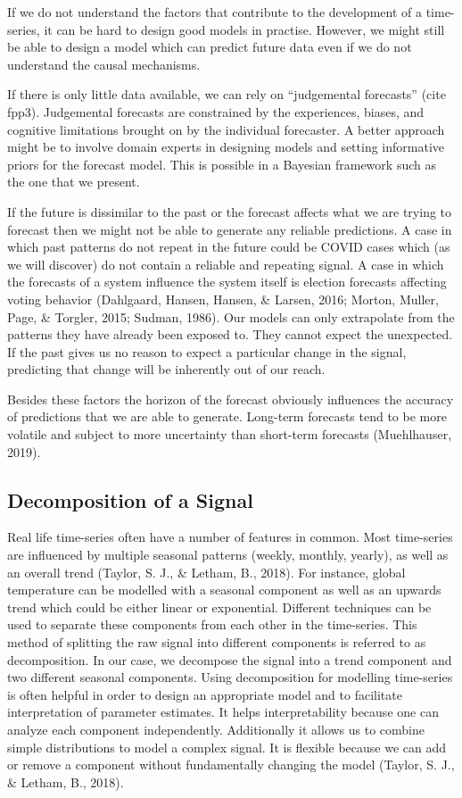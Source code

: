 \documentclass{article}
\begin{document}
If we do not understand the factors that contribute to the development of a time-series, it can be hard to design good models in practise. However, we might still be able to design a model which can predict future data even if we do not understand the causal mechanisms. 

If there is only little data available, we can rely on “judgemental forecasts” (cite fpp3). Judgemental forecasts are constrained by the experiences, biases, and cognitive limitations brought on by the individual forecaster. A better approach might be to involve domain experts in designing models and setting informative priors for the forecast model.  This is possible in a Bayesian framework such as the one that we present.

If the future is dissimilar to the past or the forecast affects what we are trying to forecast then we might not be able to generate any reliable predictions. A case in which past patterns do not repeat in the future could be COVID cases which (as we will discover) do not contain a reliable and repeating signal. A case in which the forecasts of a system influence the system itself is election forecasts affecting voting behavior (Dahlgaard, Hansen, Hansen, \& Larsen, 2016; Morton, Muller, Page, \& Torgler, 2015; Sudman, 1986). Our models can only extrapolate from the patterns they have already been exposed to. They cannot expect the unexpected. If the past gives us no reason to expect a particular change in the signal, predicting that change will be inherently out of our reach. 

Besides these factors the horizon of the forecast obviously influences the accuracy of predictions that we are able to generate. Long-term forecasts tend to be more volatile and subject to more uncertainty than short-term forecasts (Muehlhauser, 2019).  


\subsection{Decomposition of a Signal}

Real life time-series often have a number of features in common. Most time-series are influenced by multiple seasonal patterns (weekly, monthly, yearly), as well as an overall trend (Taylor, S. J., \& Letham, B., 2018). For instance, global temperature can be modelled with a seasonal component as well as an upwards trend which could be either linear or exponential. Different techniques can be used to separate these components from each other in the time-series. This method of splitting the raw signal into different components is referred to as decomposition. In our case, we decompose the signal into a trend component and two different seasonal components. Using decomposition for modelling time-series is often helpful in order to design an appropriate model and to facilitate interpretation of parameter estimates. It helps interpretability because one can analyze each component independently. Additionally it allows us to combine simple distributions to model a complex signal. It is flexible because we can add or remove a component without fundamentally changing the model (Taylor, S. J., \& Letham, B., 2018). 
\end{document}
